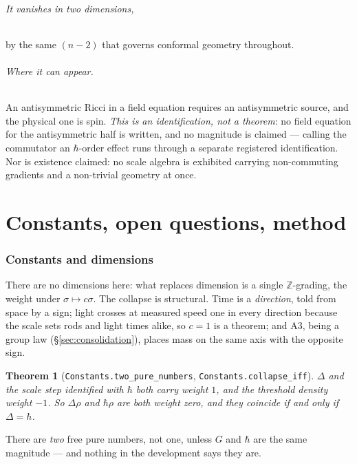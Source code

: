 \documentclass[11pt,a4paper]{article}
\newtheorem{theorem}{Theorem}[section]
\theoremstyle{definition}
\theoremstyle{remark}
\newcommand{\lean}[1]{\texttt{\small #1}}
\newcommand{\sg}{\sigma}
\begin{document}
\paragraph{It vanishes in two dimensions,} by the same $(n-2)$ that governs
conformal geometry throughout.

\paragraph{Where it can appear.}
An antisymmetric Ricci in a field equation requires an antisymmetric source, and
the physical one is spin. \emph{This is an identification, not a theorem}: no field
equation for the antisymmetric half is written, and no magnitude is claimed ---
calling the commutator an $\hbar$-order effect runs through a separate registered
identification. Nor is existence claimed: no scale algebra is exhibited carrying
non-commuting gradients and a non-trivial geometry at once.

\part{Constants, open questions, method}

\section{Constants and dimensions}
\label{sec:constants}

There are no dimensions here: what replaces dimension is a single
$\mathbb{Z}$-grading, the weight under $\sg\mapsto c\sg$. The collapse is
structural. Time is a \emph{direction}, told from space by a sign; light crosses at
measured speed one in every direction because the scale sets rods and light times
alike, so $c=1$ is a theorem; and A3, being a group law
(\S\ref{sec:consolidation}), places mass on the same axis with the opposite sign.

\begin{theorem}[\lean{Constants.two\_pure\_numbers},
\lean{Constants.collapse\_iff}]
$\Delta$ and the scale step identified with $\hbar$ both carry weight $1$, and the
threshold density weight $-1$. So $\Delta\rho$ and $\hbar\rho$ are both weight
zero, and they coincide if and only if $\Delta=\hbar$.
\end{theorem}

\begin{claimbox}
There are \emph{two} free pure numbers, not one, unless $G$ and $\hbar$ are the
same magnitude --- and nothing in the development says they are.
\end{claimbox}
\end{document}

